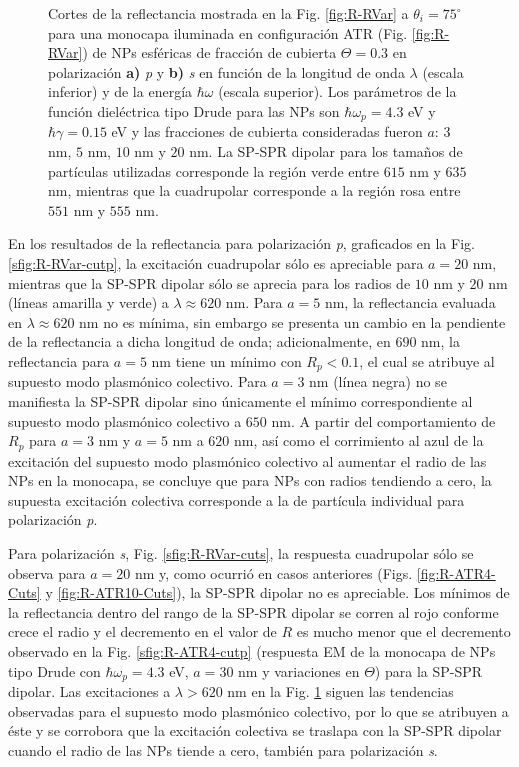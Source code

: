 \begin{figure}[h!]
	\caption{Cortes de la reflectancia mostrada en la Fig. \ref{fig:R-RVar} a $\theta_i = 75^\circ$ para una monocapa iluminada en configuración ATR (Fig. \ref{fig:R-RVar}) de NPs esféricas de fracción de cubierta $\Theta = 0.3$ en polarización \textbf{a)} \emph{p} y \textbf{b)} \emph{s} en función de la longitud de onda $\lambda$ (escala inferior) y de la energía $\hbar\omega$ (escala superior). Los parámetros de la función dieléctrica tipo Drude para las NPs son $\hbar\omega_p = 4.3$ eV y $\hbar\gamma = 0.15$ eV y las fracciones de cubierta consideradas fueron $a$: $3$ nm, $5$ nm, $10$ nm y $20$ nm. La SP-SPR dipolar para los tamaños de partículas utilizadas corresponde la región verde entre $615$ nm y $635$ nm, mientras que la cuadrupolar corresponde a la región rosa entre $551$ nm y $555$ nm.}\label{fig:R-RVar-Cuts}
	\end{figure}	

En los resultados de la reflectancia para polarización \emph{p}, graficados en la Fig. \ref{sfig:R-RVar-cutp}, la excitación cuadrupolar sólo es apreciable para $a=20$ nm, mientras que la SP-SPR dipolar sólo se aprecia para los radios de $10$ nm y $20$ nm (líneas amarilla y verde) a $\lambda\approx 620$ nm. Para $a=5$ nm, la reflectancia evaluada en $\lambda\approx 620$ nm no es mínima, sin embargo se presenta un cambio en la pendiente de la reflectancia a dicha longitud de onda; adicionalmente, en $690$ nm, la reflectancia para $a=5$ nm tiene un mínimo con $R_p<0.1$, el cual se atribuye al supuesto modo plasmónico colectivo. Para $a=3$ nm (línea negra) no se manifiesta la SP-SPR dipolar sino únicamente el mínimo correspondiente al supuesto modo plasmónico colectivo a $650$ nm. A partir del comportamiento de $R_p$ para $a=3$ nm y $a=5$ nm a $620$ nm, así como el corrimiento al azul de la excitación del supuesto modo plasmónico colectivo al aumentar el radio de las NPs en la monocapa, se concluye que para NPs con radios tendiendo a cero, la supuesta excitación colectiva corresponde a la de partícula individual para polarización \emph{p}.
 
 Para polarización \emph{s}, Fig. \ref{sfig:R-RVar-cuts}, la respuesta cuadrupolar sólo se observa para $a = 20$ nm y, como ocurrió en casos anteriores (Figs. \ref{fig:R-ATR4-Cuts} y \ref{fig:R-ATR10-Cuts}), la SP-SPR dipolar no es apreciable. Los mínimos de la reflectancia dentro del rango de la SP-SPR dipolar se corren al rojo conforme crece el radio y el decremento en el valor de $R$ es mucho menor que el decremento  observado en la Fig. \ref{sfig:R-ATR4-cutp} (respuesta EM de la monocapa de NPs tipo Drude con $\hbar\omega_p = 4.3$ eV, $a = 30$ nm y variaciones en $\Theta$) para la SP-SPR dipolar. Las excitaciones a $\lambda>620$ nm en la Fig. \ref{fig:R-RVar-Cuts} siguen las tendencias observadas para el supuesto modo plasmónico colectivo, por lo que se atribuyen a éste y se corrobora que la excitación colectiva se traslapa con la SP-SPR dipolar cuando el radio de las NPs tiende a cero, también para polarización \emph{s}.
 
